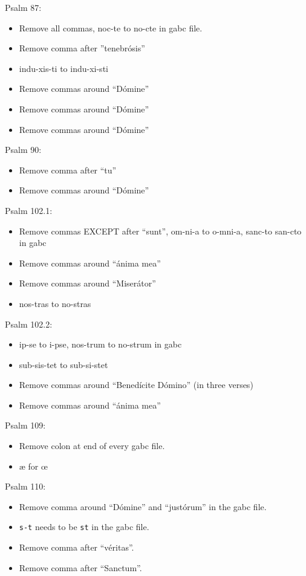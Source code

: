 \documentclass[11pt]{article}
\begin{document}
 Psalm 87:
  \begin{itemize}
  \item Remove all commas, noc-te to no-cte in gabc file.
  \item
 Remove comma after ''tenebrósis''
  \item  indu-xis-ti to indu-xi-sti
  \item Remove commas around ``Dómine''
    \item Remove commas around ``Dómine''
      \item Remove commas around ``Dómine''
    \end{itemize}

 Psalm 90:
  \begin{itemize}
    \item  Remove comma after ``tu''
  \item Remove commas around ``Dómine''
    \end{itemize}

 Psalm 102.1:
  \begin{itemize}
  \item Remove commas EXCEPT after ``sunt'', om-ni-a to o-mni-a, sanc-to san-cto in gabc
   \item Remove commas around ``ánima mea''
    \item Remove commas around ``Miserátor''
  \item  nos-tras to no-stras
    \end{itemize}

 Psalm 102.2:
  \begin{itemize}
  \item ip-se to i-pse, nos-trum to no-strum in gabc
  \item  sub-sis-tet to sub-si-stet
  \item
 Remove commas around  ``Benedícite Dómino'' (in three verses)
\item
 Remove commas around ``ánima mea''
    \end{itemize}

 
Psalm 109:
\begin{itemize}
\item Remove colon at end of every gabc file.
\item æ for œ
\end{itemize}
 
 Psalm 110:
\begin{itemize}
\item Remove comma around ``Dómine'' and ``justórum''  in the gabc file.
\item
 \texttt{s-t} needs to be  \texttt{st} in the gabc file.
\item Remove comma after ``véritas''.
\item Remove comma after ``Sanctum''.
\end{itemize}
\end{document}
